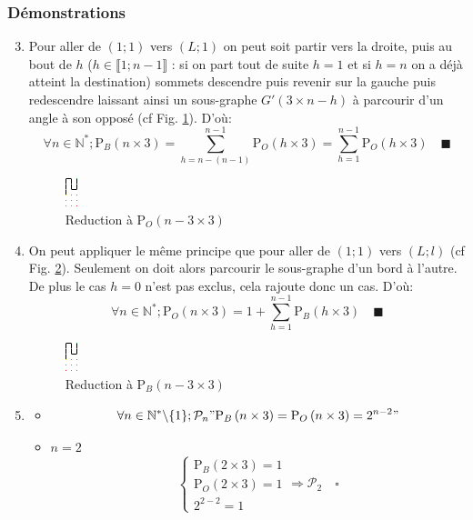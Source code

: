 \documentclass[twoside, a4paper, 12pt]{report}
\newcommand{\cqfd}[1][\quad]{\ensuremath{#1\blacksquare}}
\newcommand{\subcqfd}[1][\quad]{\ensuremath{#1\square}}
\newcommand{\pb}[2]{\ensuremath{\text{P}_B\left(#1 \times #2\right)}}
\newcommand{\po}[2]{\ensuremath{\text{P}_O\left(#1 \times #2\right)}}
\begin{document}
\subsubsection{Démonstrations}
\begin{enumerate}
\setcounter{enumi}{2}
\item Pour aller de $(1; 1)$ vers $(L; 1)$ on peut soit partir vers la droite, puis au bout de $h$ ($h \in \llbracket 1; n-1 \rrbracket$ : si on part tout de suite $h=1$ et si $h=n$ on a déjà atteint la destination) sommets descendre puis revenir sur la gauche puis redescendre laissant ainsi un sous-graphe $G'(3 \times n-h )$ à parcourir d'un angle à son opposé (cf Fig. \ref{red_pb}). D'où:
\[\forall n \in \mathbb{N^*}; \pb{n}{3} = \sum_{h=n - (n-1)}^{n-1} \po{h}{3} = \sum_{h=1}^{n-1} \po{h}{3}\cqfd\]

\begin{figure}[h]
\centering\includegraphics[angle=90, scale=5]{3_6_red_pb.png}
\caption{Reduction à \po{n-3}{3}}
\label{red_pb}
\end{figure}

\item On peut appliquer le même principe que pour aller de $(1; 1)$ vers $(L; l)$ (cf Fig. \ref{red_po}). Seulement on doit alors parcourir le sous-graphe d'un bord à l'autre. De plus le cas $h=0$ n'est pas exclus, cela rajoute donc un cas. D'où:
\[\forall n \in \mathbb{N^*}; \po{n}{3} = 1 + \sum_{h=1}^{n-1} \pb{h}{3} \cqfd\]

\begin{figure}[h]
\centering\includegraphics[angle=90, scale=5]{3_6_red_po.png}
\caption{Reduction à \pb{n-3}{3}}
\label{red_po}
\end{figure}

\item 
\begin{itemize}
\item \[\forall n \in \mathbb{N}^* \backslash \{1\}; \mathcal{P}_n "\pb{n}{3} = \po{n}{3} = 2^{n-2}"\]

\item $n = 2$
\[
\left\{
\begin{array}{ll}
\pb{2}{3} = 1\\
\po{2}{3} = 1\\
2^{2-2} = 1
\end{array}
\right.
\Rightarrow 
\mathcal{P}_2 \subcqfd
\]


\end{itemize}
\end{enumerate}
\end{document}
